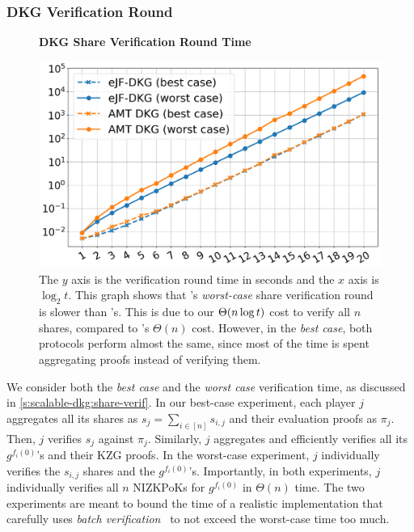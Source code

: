 \subsubsection{DKG Verification Round}
\label{s:eval:dkg:share-verif}

\begin{figure}[t]
    \centering
    \textbf{DKG Share Verification Round Time}\par\medskip
    \includegraphics[width=0.70\columnwidth]{figures-thresh/dkg-verify-times.png}
    \caption{
        The $y$ axis is the verification round time in seconds and the $x$ axis is $\log_2{t}$.
        This graph shows that \ourdkg's \textit{worst-case} share verification round is slower than \ejfdkg's.
        This is due to our $\Theta(n\log{t})$ cost to verify all $n$ shares, compared to \ejfdkg's $\Theta(n)$ cost.
        However, in the \textit{best case}, both protocols perform almost the same, since most of the time is spent aggregating proofs instead of verifying them.
    }
    \label{f:dkg-verify-times}
\end{figure}

We consider both the \textit{best case} and the \textit{worst case} verification time, as discussed in \cref{s:scalable-dkg:share-verif}.
In our best-case experiment, each player $j$ aggregates all its shares as $s_j=\sum_{i\in[n]} s_{i,j}$ and their evaluation proofs as $\pi_j$.
Then, $j$ verifies $s_j$ against $\pi_j$.
Similarly, $j$ aggregates and efficiently verifies all its $g^{f_i(0)}$'s and their KZG proofs.
In the worst-case experiment, $j$ individually verifies the $s_{i,j}$ shares and the $g^{f_i(0)}$'s.
Importantly, in both experiments, $j$ individually verifies all $n$ NIZKPoKs for $g^{f_i(0)}$ in $\Theta(n)$ time.
The two experiments are meant to bound the time of a realistic implementation that carefully uses \textit{batch verification}~\cite{Boldyreva03,LM07} to not exceed the worst-case time too much.

